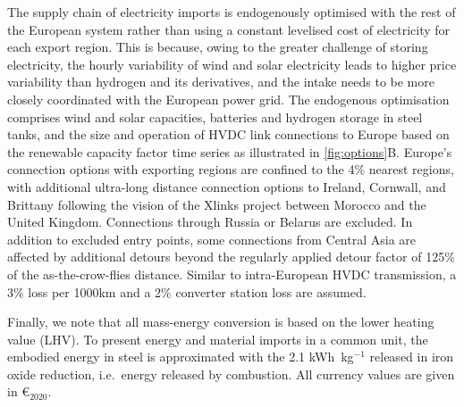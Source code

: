 The supply chain of electricity imports is endogenously optimised with the rest
of the European system rather than using a constant levelised cost of
electricity for each export region. This is because, owing to the greater
challenge of storing electricity, the hourly variability of wind and solar
electricity leads to higher price variability than hydrogen and its derivatives,
and the intake needs to be more closely coordinated with the European power
grid. The endogenous optimisation comprises wind and solar capacities, batteries
and hydrogen storage in steel tanks, and the size and operation of HVDC link
connections to Europe based on the renewable capacity factor time series as
illustrated in \cref{fig:options}B. Europe's connection options with
exporting regions are confined to the 4\% nearest regions, with additional
ultra-long distance connection options to Ireland, Cornwall, and Brittany
following the vision of the Xlinks project between Morocco and the United
Kingdom.\cite{xlinksMoroccoUKPowerProject2023} Connections through Russia or
Belarus are excluded. In addition to excluded entry points, some connections
from Central Asia are affected by additional detours beyond the regularly
applied detour factor of 125\% of the as-the-crow-flies distance. Similar to
intra-European HVDC transmission, a 3\% loss per 1000km and a 2\% converter
station loss are assumed.

\vspace{1em}

Finally, we note that all mass-energy conversion is based on the lower heating
value (LHV). To present energy and material imports in a common unit, the
embodied energy in steel is approximated with the 2.1 kWh~kg$^{-1}$ released in
iron oxide reduction, i.e.~energy released by
combustion.\cite{kuhnIronRecyclable2022} All currency values are given in
\euro{}$_{2020}$.
